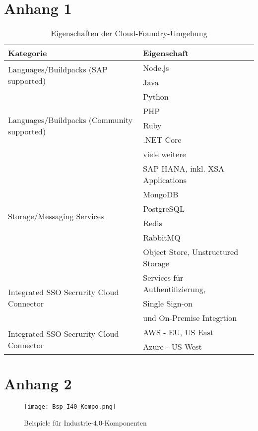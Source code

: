 \newpage
\appendix

\section{Anhang 1}

\begin{table}[h]
  \begin{tabular}{lll}
    \toprule
    Kategorie & Eigenschaft\\
    \midrule
    \multirow[t]{2}{*}{Languages/Buildpacks (SAP supported)} & Node.js  \\
     & Java \\
     \multirow[t]{5}{*}{Languages/Buildpacks (Community supported)} & Python \\
     & PHP \\
     & Ruby \\
     & .NET Core \\
     & viele weitere \\
     \multirow[t]{6}{*}{Storage/Messaging Services} & SAP HANA, inkl. XSA Applications \\
     & MongoDB \\
     & PostgreSQL \\
     & Redis \\
     & RabbitMQ \\
     & Object Store, Unstructured Storage \\
     \multirow[t]{3}{*}{Integrated SSO Secrurity Cloud Connector} & Services für Authentifizierung,\\
     & Single Sign-on \\
     & und On-Premise Integrtion \\
     \multirow[t]{3}{*}{Integrated SSO Secrurity Cloud Connector} & AWS - EU, US East\\
     & Azure - US West  \\
    \bottomrule
    \end{tabular}
    \label{cf_table}
  \caption[Eigenschaften der Cloud-Foundry-Umgebung]{Eigenschaften der Cloud-Foundry-Umgebung \citep[S. 195]{Utecht2018}}
\end{table}

\section{Anhang 2}

\begin{figure}[h]
  \centering
  \texttt{[image: Bsp\_I40\_Kompo.png]}
  \caption[Beispiele für Industrie-4.0-Komponenten]{Beispiele für Industrie-4.0-Komponenten \citep[S. 54]{BITKOM2015}}
  \label{i40kompo}
\end{figure}

